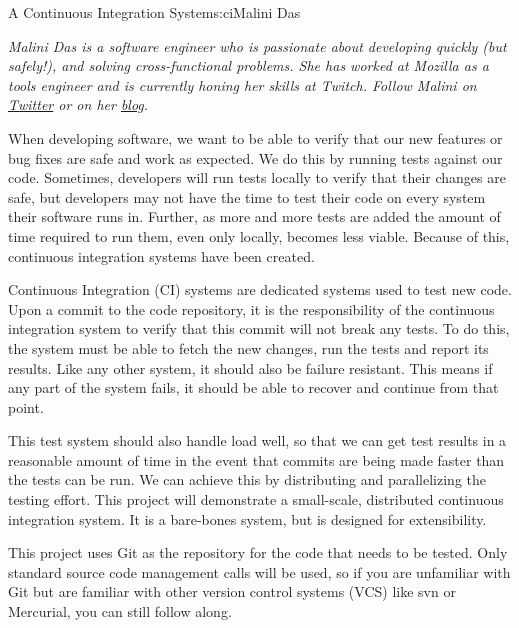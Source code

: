 \begin{aosachapter}{A Continuous Integration System}{s:ci}{Malini Das}

\emph{Malini Das is a software engineer who is passionate about
developing quickly (but safely!), and solving cross-functional problems.
She has worked at Mozilla as a tools engineer and is currently honing
her skills at Twitch. Follow Malini on
\href{https://twitter.com/malinidas}{Twitter} or on her
\href{http://malinidas.com/}{blog}.}

\label{what-is-a-continuous-integration-system}

When developing software, we want to be able to verify that our new
features or bug fixes are safe and work as expected. We do this by
running tests against our code. Sometimes, developers will run tests
locally to verify that their changes are safe, but developers may not
have the time to test their code on every system their software runs in.
Further, as more and more tests are added the amount of time required to
run them, even only locally, becomes less viable. Because of this,
continuous integration systems have been created.

Continuous Integration (CI) systems are dedicated systems used to test
new code. Upon a commit to the code repository, it is the responsibility
of the continuous integration system to verify that this commit will not
break any tests. To do this, the system must be able to fetch the new
changes, run the tests and report its results. Like any other system, it
should also be failure resistant. This means if any part of the system
fails, it should be able to recover and continue from that point.

This test system should also handle load well, so that we can get test
results in a reasonable amount of time in the event that commits are
being made faster than the tests can be run. We can achieve this by
distributing and parallelizing the testing effort. This project will
demonstrate a small-scale, distributed continuous integration system. It
is a bare-bones system, but is designed for extensibility.

\label{project-limitations-and-notes}

This project uses Git as the repository for the code that needs to be
tested. Only standard source code management calls will be used, so if
you are unfamiliar with Git but are familiar with other version control
systems (VCS) like svn or Mercurial, you can still follow along.


\end{aosachapter}
